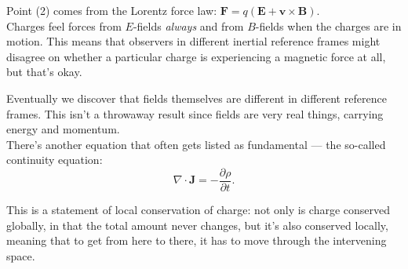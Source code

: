\documentclass{article}
\numberwithin{equation}{section}
\begin{document}
Point (2) comes from the Lorentz force law: $\bm{F} = q \left( \bm{E} + \bm{v} \times \bm{B} \right)$. \\

Charges feel forces from $E$-fields \emph{always} and from $B$-fields when the charges are in motion. This means that observers in different inertial reference frames might disagree on whether a particular charge is experiencing a magnetic force at all, but that's okay.

Eventually we discover that fields themselves are different in different reference frames. This isn't a throwaway result since fields are very real things, carrying energy and momentum. \\

There's another equation that often gets listed as fundamental --- the so-called continuity equation:
\begin{equation*}
    \nabla \cdot \bm{J} = -\frac{\partial \rho}{\partial t}.
\end{equation*}

This is a statement of local conservation of charge: not only is charge conserved globally, in that the total amount never changes, but it's also conserved locally, meaning that to get from here to there, it has to move through the intervening space.
\end{document}
